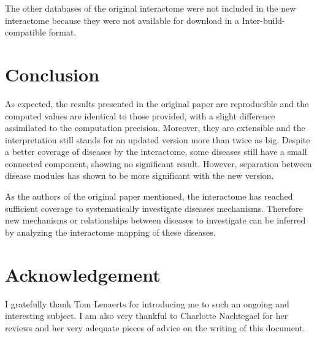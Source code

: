 \documentclass[letterpaper]{article}
\begin{document}
		The other databases of the original interactome were not included in the new interactome because they were not
		available for download in a Inter-build-compatible format.

\section{Conclusion}
As expected, the results presented in the original paper are reproducible and the computed values are
identical to those provided, with a slight difference assimilated to the computation precision.
Moreover, they are extensible and the interpretation still stands for an updated version more than
twice as big. Despite a better coverage of diseases by the interactome, some diseases still have a
small connected component, showing no significant result. However, separation between disease modules has shown to be more significant with the new version.

As the authors of the original paper mentioned, the interactome has reached sufficient coverage to
systematically investigate diseases mechanisms. Therefore new mechanisms or relationships between
diseases to investigate can be inferred by analyzing the interactome mapping of these diseases.

\section*{Acknowledgement}
I gratefully thank Tom Lenaerts for introducing me to such an ongoing and interesting subject.
I am also very thankful to Charlotte Nachtegael for her reviews and her very adequate pieces
of advice on the writing of this document.

\footnotesize

{}
\end{document}
